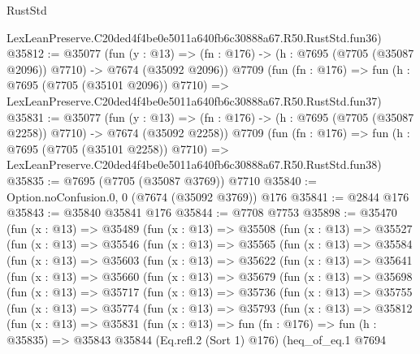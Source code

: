 \begin{lexlean}{RustStd}
\begin{coremodule}
    LexLeanPreserve.C20ded4f4be0e5011a640fb6c30888a67.R50.RustStd.fun36)
@35812 := @35077
    (fun (y : @13) =>
    (fn : @176) -> (h : @7695 (@7705 (@35087 @2096)) @7710) -> @7674 (@35092 @2096))
    @7709
    (fun (fn : @176) =>
    fun (h : @7695 (@7705 (@35101 @2096)) @7710) =>
    LexLeanPreserve.C20ded4f4be0e5011a640fb6c30888a67.R50.RustStd.fun37)
@35831 := @35077
    (fun (y : @13) =>
    (fn : @176) -> (h : @7695 (@7705 (@35087 @2258)) @7710) -> @7674 (@35092 @2258))
    @7709
    (fun (fn : @176) =>
    fun (h : @7695 (@7705 (@35101 @2258)) @7710) =>
    LexLeanPreserve.C20ded4f4be0e5011a640fb6c30888a67.R50.RustStd.fun38)
@35835 := @7695 (@7705 (@35087 @3769)) @7710
@35840 := Option.noConfusion.{0, 0} (@7674 (@35092 @3769)) @176
@35841 := @2844 @176
@35843 := @35840 @35841 @176
@35844 := @7708 @7753
@35898 := @35470
    (fun (x : @13) =>
    @35489
      (fun (x : @13) =>
      @35508
        (fun (x : @13) =>
        @35527
          (fun (x : @13) =>
          @35546
            (fun (x : @13) =>
            @35565
              (fun (x : @13) =>
              @35584
                (fun (x : @13) =>
                @35603
                  (fun (x : @13) =>
                  @35622
                    (fun (x : @13) =>
                    @35641
                      (fun (x : @13) =>
                      @35660
                        (fun (x : @13) =>
                        @35679
                          (fun (x : @13) =>
                          @35698
                            (fun (x : @13) =>
                            @35717
                              (fun (x : @13) =>
                              @35736
                                (fun (x : @13) =>
                                @35755
                                  (fun (x : @13) =>
                                  @35774
                                    (fun (x : @13) =>
                                    @35793
                                      (fun (x : @13) =>
                                      @35812
                                        (fun (x : @13) =>
                                        @35831
                                          (fun (x : @13) =>
                                          fun (fn : @176) =>
                                          fun (h : @35835) =>
                                          @35843
                                            @35844
                                            (Eq.refl.{2} (Sort 1) @176)
                                            (heq_of_eq.{1}
                                              @7694

\end{coremodule}
\end{lexlean}
